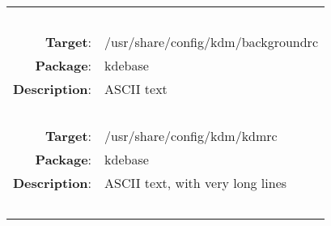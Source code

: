 \begin{longtable}{rl}
\hline
\multicolumn{2}{l}{\ }\\
\textbf{Target}: & /usr/share/config/kdm/backgroundrc\\
\textbf{Package}: & kdebase\\
\textbf{Description}: & ASCII text\\
\multicolumn{2}{l}{\ }\\
\textbf{Target}: & /usr/share/config/kdm/kdmrc\\
\textbf{Package}: & kdebase\\
\textbf{Description}: & ASCII text, with very long lines\\
\multicolumn{2}{l}{\ }\\
\hline
\end{longtable}

